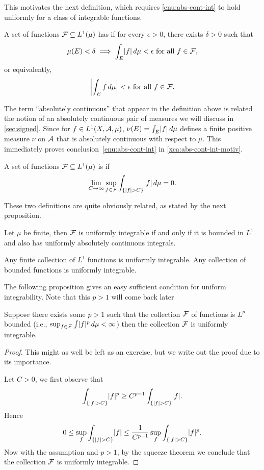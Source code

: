 This motivates the next definition, which requires \ref{enu:abs-cont-int} to hold uniformly for a class of integrable functions.

\begin{defn}
    A set of functions $\mathcal{F} \subseteq L^1(\mu)$ has  if for every $\epsilon > 0$, there exists $\delta > 0$ such that \[
        \mu(E) < \delta \implies \int_E \lvert f \rvert \,d\mu <\epsilon \text{ for all $f \in \mathcal{F}$},
    \] or equivalently, \[ \biggl\vert\int_E f \,d\mu\biggr\vert <\epsilon \text{ for all $f \in \mathcal{F}$}.
    \]
\end{defn}

The term ``absolutely continuous'' that appear in the definition above is related the notion of an absolutely continuous pair of measures we will discuss in \cref{sec:signed}. Since for $f \in L^1(X,\mathcal{A},\mu)$, $\nu(E) = \int_E \lvert f \rvert \,d\mu$ defines a finite positive measure $\nu$ on $\mathcal{A}$ that is absolutely continuous with respect to $\mu$. This immediately proves conclusion~\ref{enu:abs-cont-int} in \cref{xca:abs-cont-int-motiv}.

\begin{defn}
    A set of functions $\mathcal{F}\subseteq L^1(\mu)$ is  if \[
        \lim_{C \to \infty} \sup_{f\in \mathcal{F}} \int_{\{\lvert f \rvert > C\}} \lvert f \rvert\,d\mu = 0.
    \]
\end{defn}

These two definitions are quite obviously related, as stated by the next proposition.

\begin{prop}
    Let $\mu$ be finite, then $\mathcal{F}$ is uniformly integrable if and only if it is bounded in $L^1$ and also has uniformly absolutely continuous integrals.
\end{prop}

\begin{fact}
    Any finite collection of $L^1$ functions is uniformly integrable. Any collection of bounded functions is uniformly integrable.
\end{fact}

The following proposition gives an easy sufficient condition for uniform integrability. Note that this $p > 1$ will come back later 

\begin{prop}
    Suppose there exists some $p > 1$ such that the collection $\mathcal{F}$ of functions is $L^p$ bounded (i.e., $\sup_{f\in \mathcal{F}} \int \lvert f \rvert^p \,d\mu <\infty$) then the collection $\mathcal{F}$ is uniformly integrable.
\end{prop}
\begin{proof}
    This might as well be left as an exercise, but we write out the proof due to its importance.

    Let $C > 0$, we first observe that \[
        \int_{\{\lvert f \rvert > C\}} \lvert f \rvert^p \geq C^{p-1} \int_{\{\lvert f \rvert > C\}} \lvert f \rvert.
    \] Hence \[
        0 \leq \sup_{f} \int_{\{\lvert f \rvert > C\}} \lvert f \rvert \leq \frac{1}{C^{p-1}}\sup_f\int_{\{\lvert f \rvert > C\}} \lvert f \rvert^p.
    \] Now with the assumption and $p > 1$, by the squeeze theorem we conclude that the collection $\mathcal{F}$ is uniformly integrable.
\end{proof}

